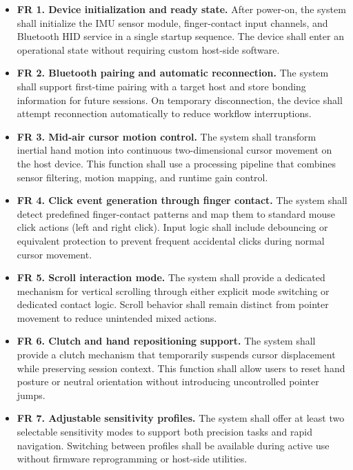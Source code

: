 \begin{itemize}
    \item \textbf{FR 1. Device initialization and ready state.} After power-on, the system shall initialize the IMU sensor module, finger-contact input channels, and Bluetooth HID service in a single startup sequence. The device shall enter an operational state without requiring custom host-side software.

    \item \textbf{FR 2. Bluetooth pairing and automatic reconnection.} The system shall support first-time pairing with a target host and store bonding information for future sessions. On temporary disconnection, the device shall attempt reconnection automatically to reduce workflow interruptions.

    \item \textbf{FR 3. Mid-air cursor motion control.} The system shall transform inertial hand motion into continuous two-dimensional cursor movement on the host device. This function shall use a processing pipeline that combines sensor filtering, motion mapping, and runtime gain control.

    \item \textbf{FR 4. Click event generation through finger contact.} The system shall detect predefined finger-contact patterns and map them to standard mouse click actions (left and right click). Input logic shall include debouncing or equivalent protection to prevent frequent accidental clicks during normal cursor movement.

    \item \textbf{FR 5. Scroll interaction mode.} The system shall provide a dedicated mechanism for vertical scrolling through either explicit mode switching or dedicated contact logic. Scroll behavior shall remain distinct from pointer movement to reduce unintended mixed actions.

    \item \textbf{FR 6. Clutch and hand repositioning support.} The system shall provide a clutch mechanism that temporarily suspends cursor displacement while preserving session context. This function shall allow users to reset hand posture or neutral orientation without introducing uncontrolled pointer jumps.

    \item \textbf{FR 7. Adjustable sensitivity profiles.} The system shall offer at least two selectable sensitivity modes to support both precision tasks and rapid navigation. Switching between profiles shall be available during active use without firmware reprogramming or host-side utilities.


\end{itemize}
